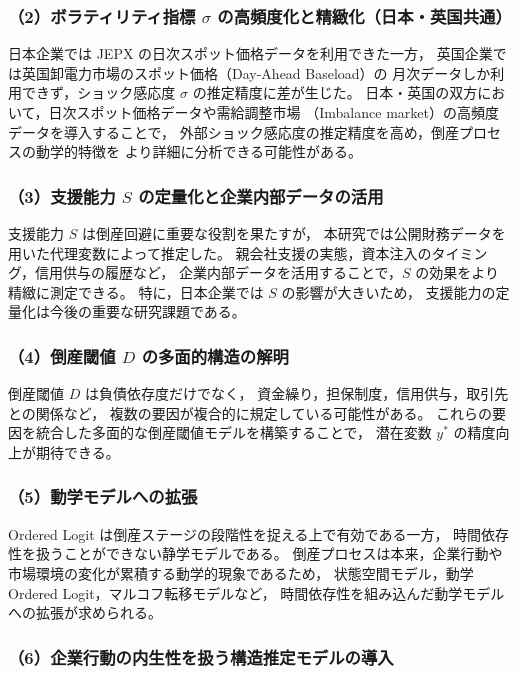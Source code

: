 \subsubsection*{（2）ボラティリティ指標 $\sigma$ の高頻度化と精緻化（日本・英国共通）}

日本企業では JEPX の日次スポット価格データを利用できた一方，
英国企業では英国卸電力市場のスポット価格（Day-Ahead Baseload）の
月次データしか利用できず，ショック感応度 $\sigma$ の推定精度に差が生じた。
日本・英国の双方において，日次スポット価格データや需給調整市場
（Imbalance market）の高頻度データを導入することで，
外部ショック感応度の推定精度を高め，倒産プロセスの動学的特徴を
より詳細に分析できる可能性がある。

\subsubsection*{（3）支援能力 $S$ の定量化と企業内部データの活用}

支援能力 $S$ は倒産回避に重要な役割を果たすが，
本研究では公開財務データを用いた代理変数によって推定した。
親会社支援の実態，資本注入のタイミング，信用供与の履歴など，
企業内部データを活用することで，$S$ の効果をより精緻に測定できる。
特に，日本企業では $S$ の影響が大きいため，
支援能力の定量化は今後の重要な研究課題である。

\subsubsection*{（4）倒産閾値 $D$ の多面的構造の解明}

倒産閾値 $D$ は負債依存度だけでなく，
資金繰り，担保制度，信用供与，取引先との関係など，
複数の要因が複合的に規定している可能性がある。
これらの要因を統合した多面的な倒産閾値モデルを構築することで，
潜在変数 $y^*$ の精度向上が期待できる。

\subsubsection*{（5）動学モデルへの拡張}

Ordered Logit は倒産ステージの段階性を捉える上で有効である一方，
時間依存性を扱うことができない静学モデルである。
倒産プロセスは本来，企業行動や市場環境の変化が累積する動学的現象であるため，
状態空間モデル，動学 Ordered Logit，マルコフ転移モデルなど，
時間依存性を組み込んだ動学モデルへの拡張が求められる。

\subsubsection*{（6）企業行動の内生性を扱う構造推定モデルの導入}

